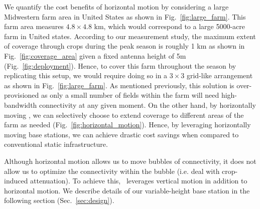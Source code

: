 We quantify the cost benefits of horizontal motion by considering a large Midwestern farm area in United States as shown in Fig.~\ref{fig:large_farm}. This farm area measures $4.8 \times 4.8$ km, which would correspond to a large 5000-acre farm in United states. According to our measurement study, the maximum extent of coverage through crops during the peak season is roughly 1 km as shown in Fig.~\ref{fig:coverage_area} given a fixed antenna height of 5m (Fig.~\ref{fig:deployment}). Hence, to cover this farm throughout the season by replicating this setup, we would require doing so in a $3 \times 3$ grid-like arrangement as shown in Fig.~\ref{fig:large_farm}. As mentioned previously, this solution is over-provisioned as only a small number of fields within the farm will need high-bandwidth connectivity at any given moment. On the other hand, by horizontally moving \name, we can selectively choose to extend coverage to different areas of the farm as needed  (Fig.~\ref{fig:horizontal_motion}). Hence, by leveraging horizontally moving base stations, we can achieve drastic cost savings when compared to conventional static infrastructure.

Although horizontal motion allows us to move bubbles of connectivity, it does not allow us to optimize the connectivity within the bubble (i.e. deal with crop-induced attenuation). To achieve this, \name\ leverages vertical motion in addition to horizontal motion. We describe details of our variable-height base station in the following section (Sec.~\ref{sec:design}).

